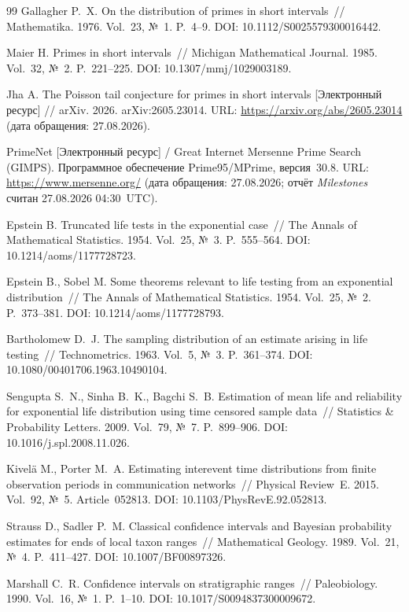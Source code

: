 \documentclass[11pt,a4paper]{article}
\theoremstyle{plain}
\theoremstyle{remark}
\begin{document}
\begin{thebibliography}{99}
 Gallagher P.~X. On the distribution of primes in short
intervals~// Mathematika. 1976. Vol.~23, №~1. P.~4--9.
DOI: 10.1112/S0025579300016442.

 Maier H. Primes in short intervals~// Michigan Mathematical
Journal. 1985. Vol.~32, №~2. P.~221--225. DOI: 10.1307/mmj/1029003189.

 Jha A. The Poisson tail conjecture for primes in short intervals
[Электронный ресурс] // arXiv. 2026. arXiv:2605.23014.
URL: \url{https://arxiv.org/abs/2605.23014} (дата обращения: 27.08.2026).

 PrimeNet [Электронный ресурс] / Great Internet Mersenne Prime
Search (GIMPS). Программное обеспечение Prime95/MPrime, версия~30.8.
URL: \url{https://www.mersenne.org/} (дата обращения: 27.08.2026;
отчёт \emph{Milestones} считан 27.08.2026 04:30~UTC).

 Epstein B. Truncated life tests in the exponential
case~// The Annals of Mathematical Statistics. 1954. Vol.~25, №~3. P.~555--564.
DOI: 10.1214/aoms/1177728723.

 Epstein B., Sobel M. Some theorems relevant to life
testing from an exponential distribution~// The Annals of Mathematical
Statistics. 1954. Vol.~25, №~2. P.~373--381. DOI: 10.1214/aoms/1177728793.

 Bartholomew D.~J. The sampling distribution of an
estimate arising in life testing~// Technometrics. 1963. Vol.~5, №~3.
P.~361--374. DOI: 10.1080/00401706.1963.10490104.

 Sengupta S.~N., Sinha B.~K., Bagchi S.~B. Estimation of
mean life and reliability for exponential life distribution using time censored
sample data~// Statistics \& Probability Letters. 2009. Vol.~79, №~7.
P.~899--906. DOI: 10.1016/j.spl.2008.11.026.

 Kivel\"{a} M., Porter M.~A. Estimating interevent time
distributions from finite observation periods in communication networks~//
Physical Review~E. 2015. Vol.~92, №~5. Article~052813.
DOI: 10.1103/PhysRevE.92.052813.

 Strauss D., Sadler P.~M. Classical confidence
intervals and Bayesian probability estimates for ends of local taxon ranges~//
Mathematical Geology. 1989. Vol.~21, №~4. P.~411--427. DOI: 10.1007/BF00897326.

 Marshall C.~R. Confidence intervals on stratigraphic
ranges~// Paleobiology. 1990. Vol.~16, №~1. P.~1--10.
DOI: 10.1017/S0094837300009672.


\end{thebibliography}
\end{document}
